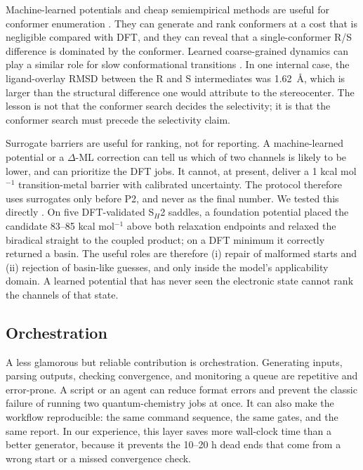 \documentclass[11pt,a4paper]{article}
\begin{document}
Machine-learned potentials and cheap semiempirical methods are useful for conformer enumeration \citep{Behler2007,Unke2021}. They can generate and rank conformers at a cost that is negligible compared with DFT, and they can reveal that a single-conformer R/S difference is dominated by the conformer. Learned coarse-grained dynamics can play a similar role for slow conformational transitions \citep{Mardt2018}. In one internal case, the ligand-overlay RMSD between the R and S intermediates was 1.62~\AA{}, which is larger than the structural difference one would attribute to the stereocenter. The lesson is not that the conformer search decides the selectivity; it is that the conformer search must precede the selectivity claim.

Surrogate barriers are useful for ranking, not for reporting. A machine-learned potential or a $\Delta$-ML correction can tell us which of two channels is likely to be lower, and can prioritize the DFT jobs. It cannot, at present, deliver a 1 kcal mol$^{-1}$ transition-metal barrier with calibrated uncertainty. The protocol therefore uses surrogates only before P2, and never as the final number. We tested this directly \citep{Neumann2024Orb,Levine2025OMol25}. On five DFT-validated S$_H$2 saddles, a foundation potential placed the candidate 83--85 kcal mol$^{-1}$ above both relaxation endpoints and relaxed the biradical straight to the coupled product; on a DFT minimum it correctly returned a basin. The useful roles are therefore (i) repair of malformed starts and (ii) rejection of basin-like guesses, and only inside the model's applicability domain. A learned potential that has never seen the electronic state cannot rank the channels of that state.

\subsection{Orchestration}

A less glamorous but reliable contribution is orchestration. Generating inputs, parsing outputs, checking convergence, and monitoring a queue are repetitive and error-prone. A script or an agent can reduce format errors and prevent the classic failure of running two quantum-chemistry jobs at once. It can also make the workflow reproducible: the same command sequence, the same gates, and the same report. In our experience, this layer saves more wall-clock time than a better generator, because it prevents the 10--20 h dead ends that come from a wrong start or a missed convergence check.
\end{document}

